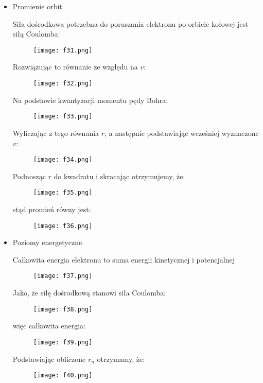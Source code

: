 \documentclass[a4paper,15pt]{article}
\begin{document}
\begin{itemize}
\item Promienie orbit 

Siła dośrodkowa potrzebna do poruszania elektronu po orbicie kołowej jest siłą Coulomba:

\begin{figure}[H]
\centerline{\texttt{[image: f31.png]}}
\end{figure}

Rozwiązując to równanie ze względu na $v$:

\begin{figure}[H]
\centerline{\texttt{[image: f32.png]}}
\end{figure}

Na podstawie kwantyzacji momentu pędy Bohra:

\begin{figure}[H]
\centerline{\texttt{[image: f33.png]}}
\end{figure}

Wyliczając z tego równania $r$, a następnie podstawiając wcześniej wyznaczone $v$:

\begin{figure}[H]
\centerline{\texttt{[image: f34.png]}}
\end{figure}


Podnosząc $r$ do kwadratu i skracając otrzymujemy, że:
\begin{figure}[H]
\centerline{\texttt{[image: f35.png]}}
\end{figure}

stąd promień równy jest:

\begin{figure}[H]
\centerline{\texttt{[image: f36.png]}}
\end{figure}

\item Poziomy energetyczne

Całkowita energia elektronu to suma energii kinetycznej i potencjalnej

\begin{figure}[H]
\centerline{\texttt{[image: f37.png]}}
\end{figure}

Jako, że siłę dośrodkową stanowi siła Coulomba:

\begin{figure}[H]
\centerline{\texttt{[image: f38.png]}}
\end{figure}

więc całkowita energia:

\begin{figure}[H]
\centerline{\texttt{[image: f39.png]}}
\end{figure}

Podstawiając obliczone $r_n$ otrzymamy, że:

\begin{figure}[H]
\centerline{\texttt{[image: f40.png]}}
\end{figure}


\end{itemize}
\end{document}
